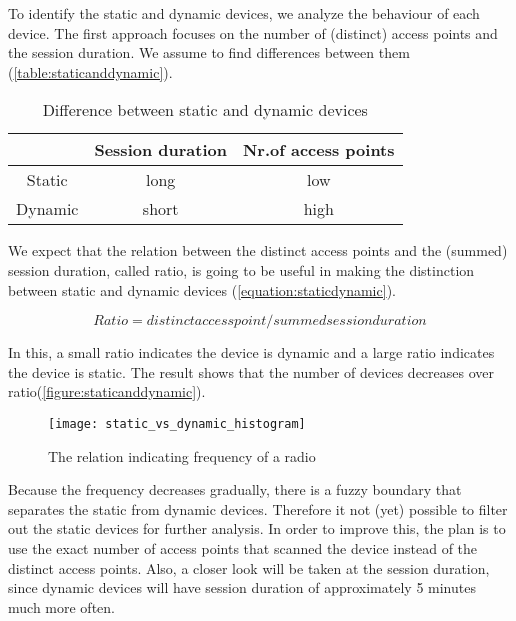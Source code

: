 To identify the static and dynamic devices, we analyze the behaviour of each device. The first approach focuses on the number of (distinct) access points and the session duration. We assume to find differences between them (\autoref{table:staticanddynamic}). 

\begin{table}[H]
\centering
\begin{tabular}{|c|c|c|}
\hline 
 & Session duration & Nr.of access points \\
\hline
Static & long & low \\
\hline
Dynamic & short & high \\
\hline	
\end{tabular}
\captionsetup{justification=centering}
\caption{Difference between static and dynamic devices}
\label{table:staticanddynamic}
\end{table}

We expect that the relation between the distinct access points and the (summed) session duration, called ratio, is going to be useful in making the distinction between static and dynamic devices (\autoref{equation:staticdynamic}).

\begin{equation}\label{equation:staticdynamic}
Ratio = distinct access point / summed session duration
\end{equation}

In this, a small ratio indicates the device is dynamic and a large ratio indicates the device is static. The result shows that the number of devices decreases over ratio(\autoref{figure:staticanddynamic}).
\begin{figure}[H]
\centering
\texttt{[image: static\_vs\_dynamic\_histogram]}
\captionsetup{justification=centering}
\caption{The relation indicating frequency of a radio}
\label{figure:staticanddynamic}
\end{figure}

Because the frequency decreases gradually, there is a fuzzy boundary that separates the static from dynamic devices. Therefore it not (yet) possible to filter out the static devices for further analysis. In order to improve this, the plan is to use the exact number of access points that scanned the device instead of the distinct access points. Also, a closer look will be taken at the session duration, since dynamic devices will have session duration of approximately 5 minutes much more often. 